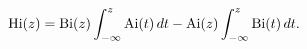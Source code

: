\[\mathop{\mathrm{Hi}\/}\nolimits\!\left(z\right)=\mathop{\mathrm{Bi}\/}%
\nolimits\!\left(z\right)\int_{-\infty}^{z}\mathop{\mathrm{Ai}\/}\nolimits\!%
\left(t\right)dt-\mathop{\mathrm{Ai}\/}\nolimits\!\left(z\right)\int_{-\infty}%
^{z}\mathop{\mathrm{Bi}\/}\nolimits\!\left(t\right)dt.\]